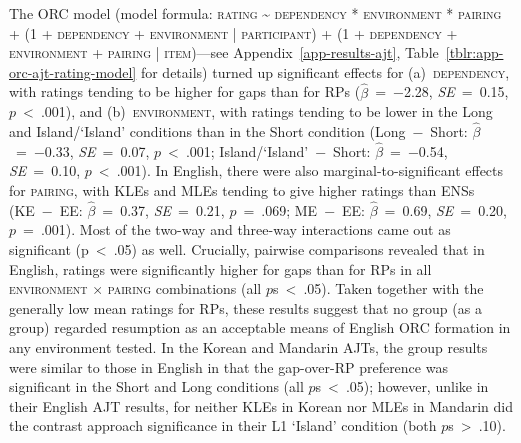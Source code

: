 The ORC model (model formula: \textsc{rating \~{} dependency * environment * pairing + (1 + dependency + environment | participant) + (1 + dependency + environment + pairing | item)}---see Appendix~\ref{app-results-ajt}, Table~\ref{tblr:app-orc-ajt-rating-model} for details) turned up significant effects for (a)~\textsc{dependency}, with ratings tending to be higher for gaps than for RPs ($\hat{\beta}$~=~−2.28, \textit{SE}~=~0.15, $p$~<~.001), and (b)~\textsc{environment}, with ratings tending to be lower in the Long and Island/`Island' conditions than in the Short condition (Long~−~Short: $\hat{\beta}$~=~−0.33, \textit{SE}~=~0.07, $p$~<~.001; Island/`Island'~−~Short: $\hat{\beta}$~=~−0.54, \textit{SE}~=~0.10, $p$~<~.001). In English, there were also marginal-to-significant effects for \textsc{pairing}, with KLEs and MLEs tending to give higher ratings than ENSs (KE~−~EE: $\hat{\beta}$~=~0.37, \textit{SE}~=~0.21, $p$~=~.069; ME~−~EE: $\hat{\beta}$~=~0.69, \textit{SE}~=~0.20, $p$~=~.001). Most of the two-way and three-way interactions came out as significant (p~<~.05) as well. Crucially, pairwise comparisons revealed that in English, ratings were significantly higher for gaps than for RPs in all \textsc{environment} × \textsc{pairing} combinations (all $p$s~<~.05). Taken together with the generally low mean ratings for RPs, these results suggest that no group (as a group) regarded resumption as an acceptable means of English ORC formation in any environment tested. In the Korean and Mandarin AJTs, the group results were similar to those in English in that the gap-over-RP preference was significant in the Short and Long conditions (all $p$s~<~.05); however, unlike in their English AJT results, for neither KLEs in Korean nor MLEs in Mandarin did the contrast approach significance in their L1 `Island' condition (both $p$s~>~.10).


